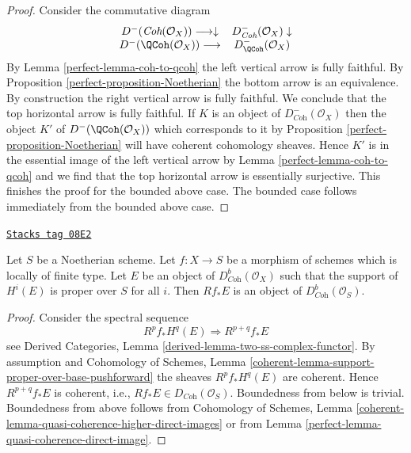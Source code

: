 \begin{proof}

Consider the commutative diagram
$$
\begin{array}{cc}D^-(\textit{Coh}(\mathcal{O}_X)) \longrightarrow\downarrow & D^-_{\textit{Coh}}(\mathcal{O}_X) \downarrow \\ D^-(\QCoh(\mathcal{O}_X)) \longrightarrow & D^-_\QCoh(\mathcal{O}_X)\end{array}
$$
By Lemma \ref{perfect-lemma-coh-to-qcoh} the left vertical arrow is fully faithful.
By Proposition \ref{perfect-proposition-Noetherian} the bottom arrow is an equivalence.
By construction the right vertical arrow is fully faithful.
We conclude that the top horizontal arrow is fully faithful.
If $K$ is an object of $D^-_{\textit{Coh}}(\mathcal{O}_X)$
then the object $K'$ of $D^-(\QCoh(\mathcal{O}_X))$ which corresponds
to it by Proposition \ref{perfect-proposition-Noetherian} will have
coherent cohomology sheaves. Hence $K'$ is in the essential
image of the left vertical arrow by Lemma \ref{perfect-lemma-coh-to-qcoh}
and we find that the top horizontal arrow is essentially surjective.
This finishes the proof for the bounded above case. The bounded
case follows immediately from the bounded above case.
\end{proof}

\begin{lemma}
\label{perfect-lemma-direct-image-coherent}
\href{https://stacks.math.columbia.edu/tag/08E2}{\texttt{Stacks tag 08E2}}

Let $S$ be a Noetherian scheme. Let $f : X \to S$ be a morphism of schemes
which is locally of finite type. Let $E$ be an object of
$D^b_{\textit{Coh}}(\mathcal{O}_X)$ such that the support of $H^i(E)$
is proper over $S$ for all $i$.
Then $Rf_*E$ is an object of $D^b_{\textit{Coh}}(\mathcal{O}_S)$.
\end{lemma}

\begin{proof}

Consider the spectral sequence
$$
R^pf_*H^q(E) \Rightarrow R^{p + q}f_*E
$$
see Derived Categories, Lemma \ref{derived-lemma-two-ss-complex-functor}.
By assumption and
Cohomology of Schemes, Lemma
\ref{coherent-lemma-support-proper-over-base-pushforward}
the sheaves $R^pf_*H^q(E)$ are coherent. Hence
$R^{p + q}f_*E$ is coherent, i.e., $Rf_*E \in D_{\textit{Coh}}(\mathcal{O}_S)$.
Boundedness from below is trivial. Boundedness from above
follows from
Cohomology of Schemes, Lemma
\ref{coherent-lemma-quasi-coherence-higher-direct-images}
or from
Lemma \ref{perfect-lemma-quasi-coherence-direct-image}.
\end{proof}

